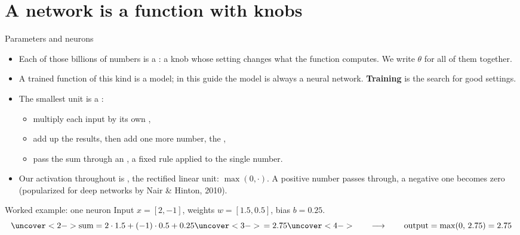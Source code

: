\documentclass[aspectratio=169,11pt,t,\primeropts]{beamer}
\begin{document}
\section{A network is a function with knobs}

\begin{frame}{Parameters and neurons}
  \begin{itemize}
    \item Each of those billions of numbers is a : a knob whose setting changes
      what the function computes. We write $\theta$ for all of them together.
    \item A trained function of this kind is a model; in this guide the model is always a neural
      network. \textbf{Training} is the search for good settings.
    \item The smallest unit is a :
      \begin{itemize}
        \item multiply each input by its own ,
        \item add up the results, then add one more number, the ,
        \item pass the sum through an , a fixed rule applied to the
          single number.
      \end{itemize}
    \item Our activation throughout is , the rectified linear unit: $\max(0,\cdot)$.
      A positive number passes through, a negative one becomes zero
      (popularized for deep networks by Nair \& Hinton, 2010).
  \end{itemize}
\end{frame}

\begin{frame}{Worked example: one neuron}
  Input $x = [2, -1]$, weights $w = [1.5, 0.5]$, bias $b = 0.25$.
  \vspace{-2mm}
  \[
    \uncover<2->{\text{sum} = 2 \cdot 1.5 + (-1) \cdot 0.5 + 0.25}\uncover<3->{\, = 2.75}
    \uncover<4->{\qquad\longrightarrow\qquad \text{output} = \max(0,\, 2.75) = 2.75}
  \]
\end{frame}
\end{document}
